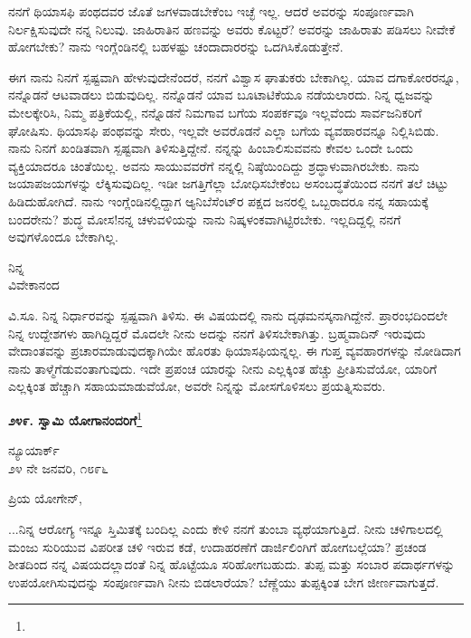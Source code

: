 ನನಗೆ ಥಿಯಾಸಫಿ ಪಂಥದವರ ಜೊತೆ ಜಗಳವಾಡಬೇಕೆಂಬ ಇಚ್ಛೆ ಇಲ್ಲ. ಆದರೆ ಅವರನ್ನು ಸಂಪೂರ್ಣವಾಗಿ ನಿರ್ಲಕ್ಷಿಸುವುದೇ ನನ್ನ ನಿಲುವು. ಜಾಹಿರಾತಿನ ಹಣವನ್ನು ಅವರು ಕೊಟ್ಟರೆ? ಅವರನ್ನು ಜಾಹಿರಾತು ಪಡಿಸಲು ನೀವೇಕೆ ಹೋಗಬೇಕು? ನಾನು ಇಂಗ್ಲೆಂಡಿನಲ್ಲಿ ಬಹಳಷ್ಟು ಚಂದಾದಾರರನ್ನು ಒದಗಿಸಿಕೊಡುತ್ತೇನೆ.

ಈಗ ನಾನು ನಿನಗೆ ಸ್ಪಷ್ಟವಾಗಿ ಹೇಳುವುದೇನೆಂದರೆ, ನನಗೆ ವಿಶ್ವಾಸ ಘಾತುಕರು ಬೇಕಾಗಿಲ್ಲ. ಯಾವ ದಗಾಕೋರರನ್ನೂ, ನನ್ನೊಡನೆ ಆಟವಾಡಲು ಬಿಡುವುದಿಲ್ಲ. ನನ್ನೊಡನೆ ಯಾವ ಬೂಟಾಟಿಕೆಯೂ ನಡೆಯಲಾರದು. ನಿನ್ನ ಧ್ವಜವನ್ನು ಮೇಲಕ್ಕೇರಿಸಿ, ನಿಮ್ಮ ಪತ್ರಿಕೆಯಲ್ಲಿ, ನನ್ನೊಡನೆ ನಿಮಗಾವ ಬಗೆಯ ಸಂಪರ್ಕವೂ ಇಲ್ಲವೆಂದು ಸಾರ್ವಜನಿಕರಿಗೆ ಘೋಷಿಸು. ಥಿಯಾಸಫಿ ಪಂಥವನ್ನು ಸೇರು, ಇಲ್ಲವೇ ಅವರೊಡನೆ ಎಲ್ಲಾ ಬಗೆಯ ವ್ಯವಹಾರವನ್ನೂ ನಿಲ್ಲಿಸಿಬಿಡು. ನಾನು ನಿನಗೆ ಖಂಡಿತವಾಗಿ ಸ್ಪಷ್ಟವಾಗಿ ತಿಳಿಸುತ್ತಿದ್ದೇನೆ. ನನ್ನನ್ನು ಹಿಂಬಾಲಿಸುವವನು ಕೇವಲ ಒಂದೇ ಒಂದು ವ್ಯಕ್ತಿಯಾದರೂ ಚಿಂತೆಯಿಲ್ಲ. ಅವನು ಸಾಯುವವರೆಗೆ ನನ್ನಲ್ಲಿ ನಿಷ್ಠೆಯಿಂದಿದ್ದು ಶ್ರದ್ಧಾಳುವಾಗಿರಬೇಕು. ನಾನು ಜಯಾ\break ಪಜಯಗಳನ್ನು ಲೆಕ್ಕಿಸುವುದಿಲ್ಲ. ಇಡೀ ಜಗತ್ತಿಗೆಲ್ಲಾ ಬೋಧಿಸಬೇಕೆಂಬ ಅಸಂಬದ್ಧತೆಯಿಂದ ನನಗೆ ತಲೆ ಚಿಟ್ಟು ಹಿಡಿದುಹೋಗಿದೆ. ನಾನು ಇಂಗ್ಲೆಂಡಿನಲ್ಲಿದ್ದಾಗ ಆ್ಯನಿಬೆಸೆಂಟ್‌ರ ಪಕ್ಷದ ಜನರಲ್ಲಿ ಒಬ್ಬರಾದರೂ ನನ್ನ ಸಹಾಯಕ್ಕೆ ಬಂದರೇನು? ಶುದ್ಧ ಮೋಸ!ನನ್ನ ಚಳುವಳಿಯನ್ನು ನಾನು ನಿಷ್ಕಳಂಕವಾಗಿಟ್ಟಿರಬೇಕು. ಇಲ್ಲದಿದ್ದಲ್ಲಿ ನನಗೆ ಅವುಗಳೊಂದೂ ಬೇಕಾಗಿಲ್ಲ.

{\flushright
ನಿನ್ನ\\ವಿವೇಕಾನಂದ\par}

ವಿ.ಸೂ.\enginline{-} ನಿನ್ನ ನಿರ್ಧಾರವನ್ನು ಸ್ಪಷ್ಟವಾಗಿ ತಿಳಿಸು. ಈ ವಿಷಯದಲ್ಲಿ ನಾನು ದೃಢಮನಸ್ಕನಾಗಿದ್ದೇನೆ. ಪ್ರಾರಂಭದಿಂದಲೇ ನಿನ್ನ ಉದ್ದೇಶಗಳು ಹಾಗಿದ್ದಿದ್ದರೆ ಮೊದಲೇ ನೀನು ಅದನ್ನು ನನಗೆ ತಿಳಿಸಬೇಕಾಗಿತ್ತು. ಬ್ರಹ್ಮವಾದಿನ್ ಇರುವುದು ವೇದಾಂತವನ್ನು ಪ್ರಚಾರಮಾಡುವುದಕ್ಕಾಗಿಯೇ ಹೊರತು ಥಿಯಾಸಫಿಯನ್ನಲ್ಲ. ಈ ಗುಪ್ತ ವ್ಯವಹಾರಗಳನ್ನು ನೋಡಿದಾಗ ನಾನು ತಾಳ್ಮೆಗೆಡುವಂತಾಗುವುದು. ಇದೇ ಪ್ರಪಂಚ\enginline{-} ಯಾರನ್ನು ನೀನು ಎಲ್ಲಕ್ಕಿಂತ ಹೆಚ್ಚು ಪ್ರೀತಿಸುವೆಯೋ, ಯಾರಿಗೆ ಎಲ್ಲಕ್ಕಿಂತ ಹೆಚ್ಚಾಗಿ ಸಹಾಯಮಾಡುವೆಯೋ, ಅವರೇ ನಿನ್ನನ್ನು ಮೋಸಗೊಳಿಸಲು ಪ್ರಯತ್ನಿಸುವರು.

\begin{center}
\textbf{೨೪೯. ಸ್ವಾಮಿ ಯೋಗಾನಂದರಿಗೆ}\footnote{}
\end{center}

\begin{flushright}
ನ್ಯೂಯಾರ್ಕ್\\೨೪ ನೇ ಜನವರಿ, ೧೮೯೬
\end{flushright}

\noindent
ಪ್ರಿಯ ಯೋಗೇನ್,

...ನಿನ್ನ ಆರೋಗ್ಯ ಇನ್ನೂ ಸ್ತಿಮಿತಕ್ಕೆ ಬಂದಿಲ್ಲ ಎಂದು ಕೇಳಿ ನನಗೆ ತುಂಬಾ ವ್ಯಥೆಯಾಗುತ್ತಿದೆ. ನೀನು ಚಳಿಗಾಲದಲ್ಲಿ ಮಂಜು ಸುರಿಯುವ ವಿಪರೀತ ಚಳಿ ಇರುವ ಕಡೆ, ಉದಾಹರಣೆಗೆ ಡಾರ್ಜಿಲಿಂಗಿಗೆ ಹೋಗಬಲ್ಲೆಯಾ? ಪ್ರಚಂಡ ಶೀತದಿಂದ ನನ್ನ ವಿಷಯದಲ್ಲಾದಂತೆ ನಿನ್ನ ಹೊಟ್ಟೆಯೂ ಸರಿಹೋಗಬಹುದು. ತುಪ್ಪ ಮತ್ತು ಸಂಬಾರ ಪದಾರ್ಥಗಳನ್ನು ಉಪಯೋಗಿಸುವುದನ್ನು ಸಂಪೂರ್ಣವಾಗಿ ನೀನು ಬಿಡಲಾರೆಯಾ? ಬೆಣ್ಣೆಯು ತುಪ್ಪಕ್ಕಿಂತ ಬೇಗ ಜೀರ್ಣವಾಗುತ್ತದೆ.

